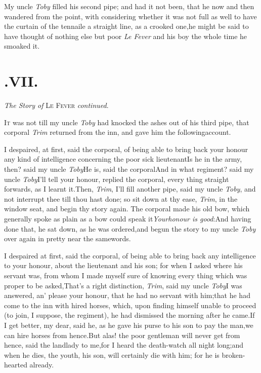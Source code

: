 \documentclass{article}
\begin{document}
My uncle \textit{Toby} filled his second pipe; and had it not
been, that he now and then wandered from the point, with
considering whether it was not full as well to have the curtain of the tennaile a straight
line, as a crooked one,\tsk he might be said to have thought of
nothing else but poor \textit{Le Fever} and his boy the whole time he
smoaked it.

\vfill{}\eject
\section{.\enspace VII.}

\medskip
\centerline{\textit{The Story of} \textsc{Le Fever} \textit{continued}.}

\lettrine It was not till my uncle \textit{Toby} had knocked the
ashes out of his third pipe, that corporal \textit{Trim}
returned from the inn, and gave him the following\break account.

I despaired, at first, said the corporal, of being able to bring
back your honour any kind of intelligence concerning the poor
sick lieutenant\tsk Is he in the army, then? said my uncle
\textit{Toby}\tsh He is, said the corporal\tsh And in what
regiment? said my uncle \textit{Toby}\tsh I’ll tell your honour,
replied the corporal, every thing straight forwards, as I learnt
it.\tsk\break Then, \textit{Trim}, I’ll fill another pipe, said my
uncle \textit{Toby}, and not interrupt thee
till thou hast done; so sit down at thy ease, \textit{Trim}, in
the window seat, and begin thy story again. The corporal made
his old bow, which generally spoke as plain as a bow could speak
it\tsk \textit{Your\break honour is good}:\tsk And having done that,
he sat down, as he was ordered,\tsk\break and begun the story to my
uncle \textit{Toby} over again in pretty near the same\break words.

I despaired at first, said the corporal, of being able to bring
back any intelligence to your honour, about the lieutenant and his
son; for when I asked where his servant was, from whom I made
myself sure of knowing every thing which was proper to be
asked,\tsk\break That’s a right distinction, \textit{Trim}, said my
uncle \textit{Toby}\tsk I was answered, an’ please your
honour, that he had no servant with him;\tsh that he had
come to the inn with hired horses, which, upon finding himself
unable to proceed (to join, I suppose, the regiment), he had
dismissed the morning after he came.\tsk If I get better, my
dear, said he, as he gave his purse to his son to pay the man,\tsk we
can hire horses from hence.\tsh But alas! the poor
gentleman will never get from hence, said the landlady to
me,\tsk for I heard the death-watch all night
long;\tsh and when he dies, the youth, his son, will
certainly die with him; for he is broken-hearted already.
\end{document}
